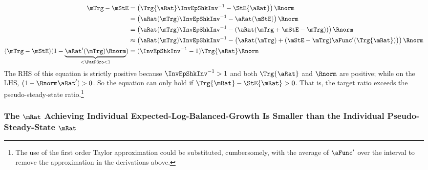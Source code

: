 \documentclass[\econtexRoot/BufferStockTheory]{subfiles}
\begin{document}
\begin{equation}\begin{split}
  \mTrg - \mStE %
 & = \left(\Trg{\aRat} \InvEpShkInv^{-1} - \StE{\aRat} \right)\Rnorm 
\\ & = \left({\aRat}(\mTrg) \InvEpShkInv^{-1} - {\aRat}(\mStE) \right)\Rnorm 
\\ & = \left({\aRat}(\mTrg) \InvEpShkInv^{-1} - \left({\aRat}(\mTrg+\mStE-\mTrg)\right) \right)\Rnorm 
\\ & \approx \left({\aRat}(\mTrg) \InvEpShkInv^{-1} - \left({\aRat}(\mTrg)+(\mStE-\mTrg)\aFunc^{\prime}(\Trg{\mRat})\right) \right)\Rnorm 
  \\ (\mTrg - \mStE)(1-\underbrace{{\aRat}^{\prime}(\mTrg)\Rnorm}_{< \PatPGro < 1}) & = (\InvEpShkInv^{-1} - 1)\Trg{\aRat}\Rnorm
\end{split}\end{equation}
The RHS of this equation is strictly positive because $\InvEpShkInv^{-1}>1$ and both $\Trg{\aRat}$ and $\Rnorm$ are positive; while on the LHS, $(1-\Rnorm\aRat^{\prime})>0$.  So the equation can only hold if $\Trg{\mRat}-\StE{\mRat} > 0$.  That is, the target ratio exceeds the pseudo-steady-state ratio.\footnote{The use of the first order Taylor approximation could be substituted, cumbersomely, with the average of $\aFunc^{\prime}$ over the interval to remove the approximation in the derivations above.}

\subsubsection{The $\mRat$  Achieving Individual Expected-Log-Balanced-Growth Is Smaller than the Individual Pseudo-Steady-State $\mRat$}
\end{document}
